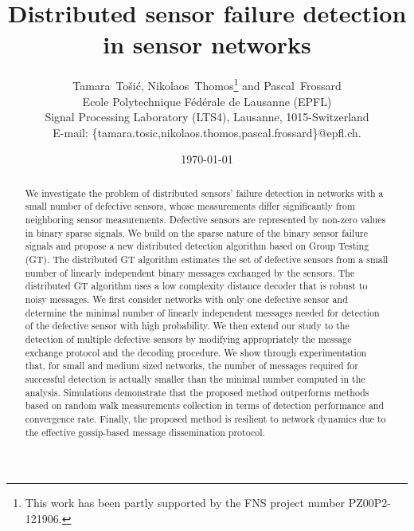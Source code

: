 \documentclass[journal]{IEEEtran}
\begin{document}
\title{Distributed sensor failure detection in sensor networks}

\author{Tamara~To\v{s}i\'{c}, Nikolaos~Thomos\thanks{This work has been partly supported by the FNS project number PZ00P2-121906.} and Pascal~Frossard\\
{E}cole Polytechnique F\'{e}d\'{e}rale de Lausanne (EPFL)\\
Signal Processing Laboratory (LTS4), Lausanne, 1015-Switzerland\\
E-mail: \{tamara.tosic,nikolaos.thomos,pascal.frossard\}@epfl.ch.
} 




\date{\today}

\maketitle

\thispagestyle{empty}

\begin{abstract}
We investigate the problem of distributed sensors' failure detection in networks with a small number of defective sensors, whose measurements differ significantly from neighboring sensor measurements. Defective sensors are represented by non-zero values in binary sparse signals. We build on the sparse nature of the binary sensor failure signals and propose a new distributed detection algorithm based on Group Testing (GT). The distributed GT algorithm estimates the set of defective sensors from a small number of linearly independent binary messages exchanged by the sensors. The distributed GT algorithm uses a low complexity distance decoder that is robust to noisy messages. We first consider networks with only one defective sensor and determine the minimal number of linearly independent messages needed for detection of the defective sensor with high probability. We then extend our study to the detection of multiple defective sensors by modifying appropriately the message exchange protocol and the decoding procedure. We show through experimentation that, for small and medium sized networks, the number of messages required for successful detection is actually smaller than the minimal number computed in the analysis. Simulations demonstrate that the proposed method outperforms methods based on random walk measurements collection in terms of detection performance and convergence rate. Finally, the proposed method is resilient to network dynamics due to the effective gossip-based message dissemination protocol. 
\end{abstract}
\end{document}
